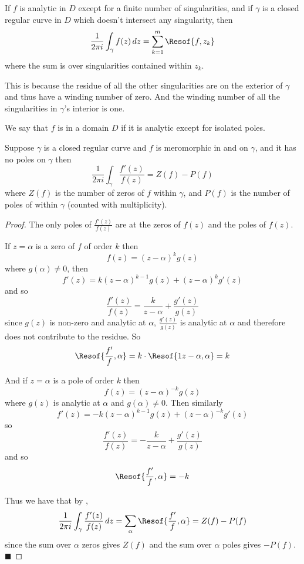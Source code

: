 \documentclass[10pt]{article}
\def\qed{%
    \ifmmode%
        \eqno\blacksquare%
    \else%
        \hskip1cm\allowbreak\hbox{}\nobreak\hfill$\blacksquare$%
    \fi%
}
\begin{document}
\begin{coro*}

    If $f$ is analytic in $D$ except for a finite number of singularities, and if $\gamma$ is a closed regular curve in $D$ which doesn't intersect any singularity, then
    \[ \frac1{2\pi i}\int_\gamma f(z)\,dz = \sum_{k=1}^m \Resof{f,z_k} \]
    where the sum is over singularities contained within $z_k$.

\end{coro*}

This is because the residue of all the other singularities are on the exterior of $\gamma$ and thus have a winding number of zero.
And the winding number of all the singularities in $\gamma$'s interior is one.

\begin{defn*}

    We say that $f$ is  in a domain $D$ if it is analytic except for isolated poles.

\end{defn*}

\begin{thrm*}

    Suppose $\gamma$ is a closed regular curve and $f$ is meromorphic in and on $\gamma$, and it has no poles on $\gamma$ then
    \[ \frac1{2\pi i}\int_\gamma\frac{f'(z)}{f(z)} = Z(f) - P(f) \]
    where $Z(f)$ is the number of zeros of $f$ within $\gamma$, and $P(f)$ is the number of poles of within $\gamma$ (counted with multiplicity).

\end{thrm*}

\begin{proof}

    The only poles of $\frac{f'(z)}{f(z)}$ are at the zeros of $f(z)$ and the poles of $f(z)$.

    If $z=\alpha$ is a zero of $f$ of order $k$ then
    \[ f(z) = (z-\alpha)^k g(z) \]
    where $g(\alpha)\neq0$, then
    \[ f'(z) = k(z-\alpha)^{k-1}g(z) + (z-\alpha)^k g'(z) \]
    and so
    \[ \frac{f'(z)}{f(z)} = \frac k{z-\alpha} + \frac{g'(z)}{g(z)} \]
    since $g(z)$ is non-zero and analytic at $\alpha$, $\frac{g'(z)}{g(z)}$ is analytic at $\alpha$ and therefore does not contribute to the residue.
    So
    \[ \Resof{\frac{f'}f,\alpha} = k\cdot\Resof{1{z-\alpha},\alpha} = k \]

    And if $z=\alpha$ is a pole of order $k$ then
    \[ f(z) = (z-\alpha)^{-k}g(z) \]
    where $g(z)$ is analytic at $\alpha$ and $g(\alpha)\neq0$.
    Then similarly
    \[ f'(z) = -k(z-\alpha)^{k-1}g(z) + (z-\alpha)^{-k}g'(z) \]
    so
    \[ \frac{f'(z)}{f(z)} = -\frac k{z-\alpha} + \frac{g'(z)}{g(z)} \]
    and so
    \[ \Resof{\frac{f'}f,\alpha} = -k \]

    Thus we have that by ,
    \[ \frac1{2\pi i}\int_\gamma\frac{f'(z)}{f(z)}\,dz = \sum_\alpha \Resof{\frac{f'}f,\alpha} = Z(f) - P(f) \]
    since the sum over $\alpha$ zeros gives $Z(f)$ and the sum over $\alpha$ poles gives $-P(f)$.
    \qed

\end{proof}
\end{document}

